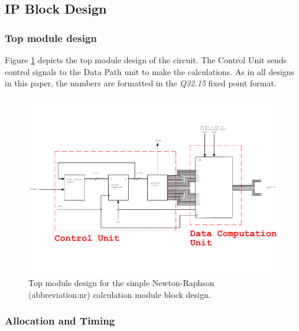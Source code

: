 \documentclass[a4paper, twoside, 11pt]{article}
\newcommand{\fbar}{\FloatBarrier}
\begin{document}
    \subsection{IP Block Design}
        
        \fbar
        \subsubsection{Top module design}
            Figure \ref{fig:simple-nr-top-module} depicts the top module design of the circuit. The Control Unit sends control signals to the Data Path unit to make the calculations. As in all designs in this paper, the numbers are formatted in the \textit{Q32.15} fixed point format.
            \begin{figure}[htbp!]
                \centering
                \includegraphics[width=1\textwidth]{src/pdf/simple-nr-top-module.pdf}
                \caption{Top module design for the simple Newton-Raphson (\gls{abbreviation:nr}) calculation module block design.}
                \label{fig:simple-nr-top-module}
            \end{figure}

        \fbar
        \subsubsection{Allocation and Timing}
            
\end{document}
